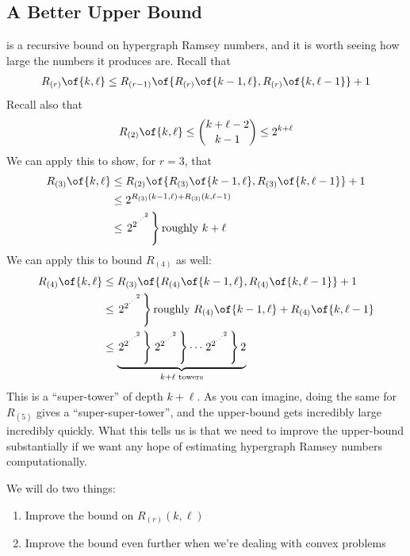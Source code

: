 \subsection{A Better Upper Bound}

 is a recursive bound on hypergraph Ramsey numbers, and it is worth seeing how large the numbers it produces are. Recall that
\begin{align*}
    R_{(r)}\of{k, \ell} \leq R_{(r - 1)}\of{R_{(r)}\of{k-1, \ell}, R_{(r)}\of{k, \ell - 1}} + 1
\end{align*}
Recall also that
\begin{align*}
    R_{(2)}\of{k, \ell}
    \leq \binom{k + \ell - 2}{k - 1}
    \leq 2^{k + \ell}
\end{align*}
We can apply this to show, for $r = 3$, that
\begin{align*}
    R_{(3)}\of{k, \ell}
    & \leq R_{(2)}\of{R_{(3)}\of{k - 1, \ell}, R_{(3)}\of{k, \ell - 1}} + 1 \\
    & \leq 2^{R_{(3)}(k - 1, \ell) + R_{(3)}(k, \ell - 1)} \\
    & \leq \left. 2^{2^{\cdot^{\cdot^{\cdot^{2}}}}} \right\} \text{roughly } k + \ell
\end{align*}
We can apply this to bound $R_{(4)}$ as well:
\begin{align*}
    R_{(4)}\of{k, \ell}
    & \leq R_{(3)}\of{R_{(4)}\of{k - 1, \ell}, R_{(4)}\of{k, \ell - 1}} + 1 \\
    & \leq \left. 2^{2^{\cdot^{\cdot^{\cdot^{2}}}}} \right\} \text{roughly } R_{(4)}\of{k - 1, \ell} + R_{(4)}\of{k, \ell - 1} \\
    & \leq \underbrace{\left. 2^{2^{\cdot^{\cdot^{\cdot^{2}}}}} \right\} \left. 2^{2^{\cdot^{\cdot^{\cdot^{2}}}}} \right\} \cdots \left. 2^{2^{\cdot^{\cdot^{\cdot^{2}}}}} \right\} 2}_{k + \ell \text{ towers}}
\end{align*}
This is a ``super-tower'' of depth $k + \ell$. As you can imagine, doing the same for $R_{(5)}$ gives a ``super-super-tower'', and the upper-bound gets incredibly large incredibly quickly. What this tells us is that we need to improve the upper-bound substantially if we want any hope of estimating hypergraph Ramsey numbers computationally.

We will do two things:
\begin{enumerate}
    \item Improve the bound on $R_{(r)}(k, \ell)$
    \item Improve the bound even further when we're dealing with convex problems
\end{enumerate}

